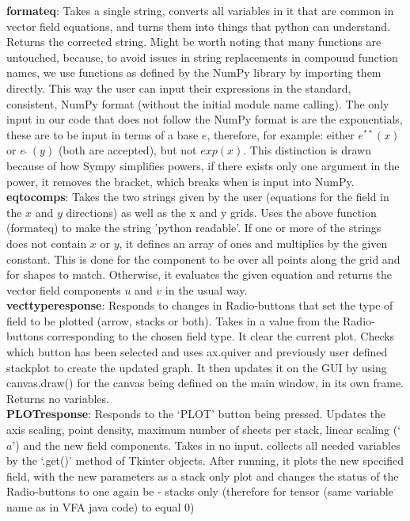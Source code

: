 \documentclass[12pt]{report}
\begin{document}
\textbf{format\textunderscore eq}: Takes a single string, converts all variables in it that are common in vector field equations, and turns them into things that python can understand. Returns the corrected string.
Might be worth noting that many functions are untouched, because, to avoid issues in string replacements in compound function names, we use functions as defined by the NumPy library by importing them directly. This way the user can input their expressions in the standard, consistent, NumPy format (without the initial module name calling). The only input in our code that does not follow the NumPy format is are the exponentials, these are to be input in terms of a base $e$, therefore, for example: either $e^{**}(x)$ or $e \  \hat{} \ (y)$ (both are accepted), but not $exp(x)$. This distinction is drawn because of how Sympy simplifies powers, if there exists only one argument in the power, it removes the bracket, which breaks when is input into NumPy.\\
\textbf{eq\textunderscore to\textunderscore comps}: Takes the two strings given by the user (equations for the field in the $x$ and $y$ directions) as well as the x and y grids. Uses the above function (format\textunderscore eq) to make the string 'python readable'. If one or more of the strings does not contain $x$ or $y$, it defines an array of ones and multiplies by the given constant. This is done for the component to be over all points along the grid and for shapes to match. Otherwise, it evaluates the given equation and returns the vector field components $u$ and $v$ in the usual way.\\
\textbf{vect\textunderscore type\textunderscore response}: Responds to changes in Radio-buttons that set the type of field to be plotted (arrow, stacks or both). Takes in a value from the Radio-buttons corresponding to the chosen field type. It clear the current plot. Checks which button has been selected and uses ax.quiver and previously user defined stack\textunderscore plot to create the updated graph. It then updates it on the GUI by using canvas.draw() for the canvas being defined on the main window, in its own frame. Returns no variables.\\
\textbf{PLOT\textunderscore response}: Responds to the `PLOT' button being pressed. Updates the axis scaling, point density, maximum number of sheets per stack, linear scaling (`$a$') and the new field components. Takes in no input. collects all needed variables by the `.get()' method of Tkinter objects. After running, it plots the new specified field, with the new parameters as a stack only plot and changes the status of the Radio-buttons to one again be - stacks only (therefore for tensor (same variable name as in VFA java code) to equal 0)\\
\end{document}
